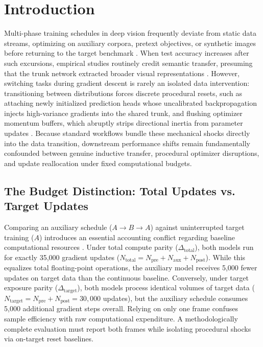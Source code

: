 \documentclass[sn-mathphys,Numbered]{sn-jnl}
\begin{document}

\maketitle

\section{Introduction}\label{sec:intro}

Multi-phase training schedules in deep vision frequently deviate from static data streams, optimizing on auxiliary corpora, pretext objectives, or synthetic images before returning to the target benchmark \cite{phang2018stilts,davidson2020sequential,mayo2023multitask}. When test accuracy increases after such excursions, empirical studies routinely credit semantic transfer, presuming that the trunk network extracted broader visual representations \cite{ramkumar2024fomo}. However, switching tasks during gradient descent is rarely an isolated data intervention: transitioning between distributions forces discrete procedural resets, such as attaching newly initialized prediction heads whose uncalibrated backpropagation injects high-variance gradients into the shared trunk, and flushing optimizer momentum buffers, which abruptly strips directional inertia from parameter updates \cite{jung2026prior}. Because standard workflows bundle these mechanical shocks directly into the data transition, downstream performance shifts remain fundamentally confounded between genuine inductive transfer, procedural optimizer disruptions, and update reallocation under fixed computational budgets.

\subsection{The Budget Distinction: Total Updates vs. Target Updates}\label{subsec:intro_budgets}

Comparing an auxiliary schedule ($A \to B \to A$) against uninterrupted target training ($A$) introduces an essential accounting conflict regarding baseline computational resources \cite{mitchell2025unlearning}. Under total compute parity ($\Delta_{\mathrm{total}}$), both models run for exactly 35,000 gradient updates ($N_{\mathrm{total}} = N_{\mathrm{pre}} + N_{\mathrm{aux}} + N_{\mathrm{post}}$). While this equalizes total floating-point operations, the auxiliary model receives 5,000 fewer updates on target data than the continuous baseline. Conversely, under target exposure parity ($\Delta_{\mathrm{target}}$), both models process identical volumes of target data ($N_{\mathrm{target}} = N_{\mathrm{pre}} + N_{\mathrm{post}} = 30{,}000$ updates), but the auxiliary schedule consumes 5,000 additional gradient steps overall. Relying on only one frame confuses sample efficiency with raw computational expenditure. A methodologically complete evaluation must report both frames while isolating procedural shocks via on-target reset baselines.
\end{document}
